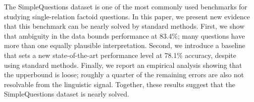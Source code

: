 The SimpleQuestions dataset is one of the most commonly used benchmarks for studying single-relation factoid questions. In this paper, we present new evidence that this benchmark can be nearly solved by standard methods. First, we show that ambiguity in the data bounds performance at 83.4\%; many questions have more than one equally plausible interpretation. Second, we introduce a baseline that sets a new state-of-the-art performance level at 78.1\% accuracy, despite using standard methods. Finally, we report an empirical analysis showing that the upperbound is loose; roughly a quarter of the remaining errors are also not resolvable from the linguistic signal. Together, these results suggest that the SimpleQuestions dataset is nearly solved.
